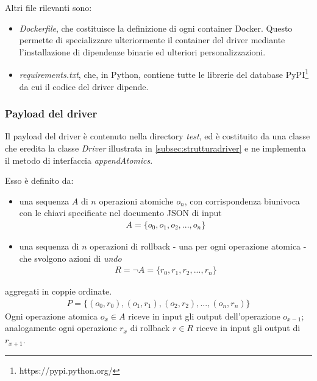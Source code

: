 \documentclass[../main.tex]{subfiles}
\begin{document}
Altri file rilevanti sono:
\begin{itemize}
    \item \textit{Dockerfile}, che costituisce la definizione di ogni container Docker. Questo permette di specializzare ulteriormente il container del driver mediante l'installazione di dipendenze binarie ed ulteriori personalizzazioni.
    \item \textit{requirements.txt}, che, in Python, contiene tutte le librerie del database PyPI\footnote{https://pypi.python.org/} da cui il codice del driver dipende.
\end{itemize}


\subsubsection{Payload del driver}

\label{subsec:payload}
Il payload del driver è contenuto nella directory \textit{test}, ed è costituito da una classe che eredita la classe \textit{Driver} illustrata in \ref{subsec:strutturadriver} e ne implementa il metodo di interfaccia \textit{appendAtomics}.

Esso è definito da:
\begin{itemize}
\item una sequenza $A$ di $n$ operazioni atomiche $o_n$, con corrispondenza biunivoca con le chiavi specificate nel documento JSON di input
\begin{align*}
A = \{ o_0, o_1, o_2, ... , o_n \}
\end{align*}
\item una sequenza di $n$ operazioni di rollback - una per ogni operazione atomica - che svolgono azioni di \textit{undo}
\begin{align*}
R = \lnot A = \{ r_0, r_1, r_2, ... , r_n \}
\end{align*}
\end{itemize}
aggregati in coppie ordinate.
\begin{align*}
P = \{ (o_0, r_0), (o_1, r_1) , (o_2, r_2) , ... , (o_n, r_n)\}
\end{align*}
Ogni operazione atomica $o_x \in A$ riceve in input gli output dell'operazione $o_{x-1}$; analogamente ogni operazione $r_x$ di rollback $r \in R$ riceve in input gli output di $r_{x+1}$.
\end{document}
